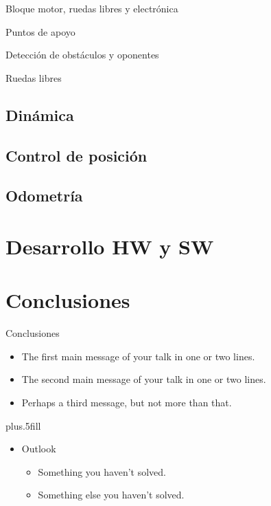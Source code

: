 \documentclass{beamer}
\begin{document}
\begin{frame}{Bloque motor, ruedas libres y electrónica}
\end{frame}

\begin{frame}{Puntos de apoyo}
\end{frame}

\begin{frame}{Detección de obstáculos y oponentes}
\end{frame}

\begin{frame}{Ruedas libres}
\end{frame}



\subsection{Dinámica}
\subsection{Control de posición}
\subsection{Odometría}

\section{Desarrollo HW y SW}

\appendix
\section*{Conclusiones}

\begin{frame}{Conclusiones}

  \begin{itemize}
  \item
    The \alert{first main message} of your talk in one or two lines.
  \item
    The \alert{second main message} of your talk in one or two lines.
  \item
    Perhaps a \alert{third message}, but not more than that.
  \end{itemize}
  
  \vskip0pt plus.5fill
  \begin{itemize}
  \item
    Outlook
    \begin{itemize}
    \item
      Something you haven't solved.
    \item
      Something else you haven't solved.
    \end{itemize}
  \end{itemize}
\end{frame}
\end{document}
